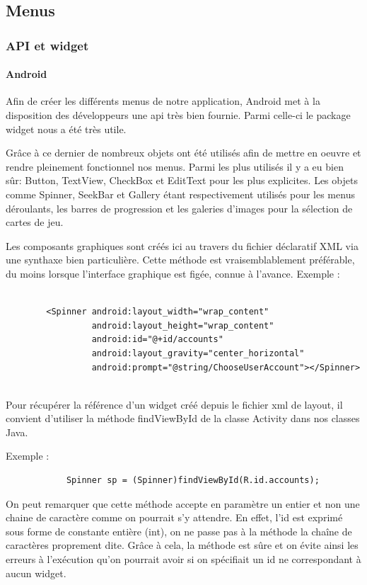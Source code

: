 \subsection{Menus}
	\subsubsection{API et widget}
	\paragraph{Android\\}
		Afin de créer les différents menus de notre application, Android met à la
		disposition des développeurs une \gls{api} très bien fournie. Parmi celle-ci le package \gls{widget}
		nous a été très utile. 
		
		Grâce à ce dernier de nombreux objets ont été utilisés
		afin de mettre en oeuvre et rendre pleinement fonctionnel nos menus.
		Parmi les plus utilisés il y a eu bien sûr: Button, TextView, CheckBox et
		EditText pour les plus explicites. Les objets comme Spinner, SeekBar et
		Gallery étant respectivement utilisés pour les menus déroulants, les barres de
		progression et les galeries d'images pour la sélection de cartes de jeu.
		
		Les composants graphiques sont créés ici au travers du fichier déclaratif
		XML via une synthaxe bien particulière. Cette méthode est vraisemblablement
		préférable, du moins lorsque l’interface graphique est figée, connue à l’avance. 
		Exemple :
		\begin{verbatim}
		
		<Spinner android:layout_width="wrap_content"
				 android:layout_height="wrap_content"
				 android:id="@+id/accounts"
				 android:layout_gravity="center_horizontal"
				 android:prompt="@string/ChooseUserAccount"></Spinner>
				
		\end{verbatim}		
		
		
		Pour récupérer la référence d’un widget créé depuis le
		fichier xml de layout, il convient d’utiliser la méthode findViewById de la
		classe Activity dans nos classes Java.
		
		Exemple :
		\begin{verbatim}
			Spinner sp = (Spinner)findViewById(R.id.accounts);
		\end{verbatim}
		
		On peut remarquer que cette méthode accepte en paramètre un entier et non une
		chaine de caractère  comme on pourrait s’y attendre. En effet, l’id est exprimé sous forme de constante entière (int), on
		ne passe pas à la méthode la chaîne de caractères proprement dite. Grâce à cela, la
		méthode est sûre et on évite ainsi les erreurs à l’exécution qu’on pourrait avoir si on
		spécifiait un id ne correspondant à aucun widget.
		
